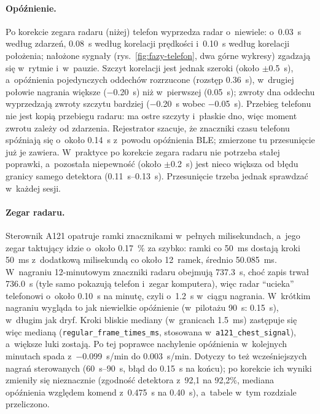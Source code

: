 \documentclass[12pt,a4paper,oneside]{report}
\begin{document}
\paragraph{Opóźnienie.} Po korekcie zegara radaru (niżej) telefon wyprzedza radar
o~niewiele: o~\SI{0.03}{s} według zdarzeń, \SI{0.08}{s} według korelacji
prędkości i~\SI{0.10}{s} według korelacji położenia; nałożone sygnały
(rys.~\ref{fig:fazy-telefon}, dwa górne wykresy) zgadzają się w~rytmie
i~w~pauzie. Szczyt korelacji jest jednak szeroki (około $\pm$\SI{0.5}{s}),
a~opóźnienia pojedynczych oddechów rozrzucone (rozstęp \SI{0.36}{s}), w~drugiej
połowie nagrania większe (\SI{-0.20}{s}) niż w~pierwszej (\SI{0.05}{s}); zwroty
dna oddechu wyprzedzają zwroty szczytu bardziej (\SI{-0.20}{s} wobec
\SI{-0.05}{s}). Przebieg telefonu nie jest kopią przebiegu radaru: ma ostre
szczyty i~płaskie dno, więc moment zwrotu zależy od zdarzenia. Rejestrator
szacuje, że znaczniki czasu telefonu spóźniają się o~około \SI{0.14}{s}
z~powodu opóźnienia BLE; zmierzone tu przesunięcie już je zawiera. W~praktyce
po korekcie zegara radaru nie potrzeba stałej poprawki, a~pozostała niepewność
(około $\pm$\SI{0.2}{s}) jest nieco większa od błędu granicy samego detektora
(\SIrange{0.11}{0.13}{s}). Przesunięcie trzeba jednak sprawdzać w~każdej sesji.

\paragraph{Zegar radaru.} Sterownik A121 opatruje ramki znacznikami w~pełnych
milisekundach, a~jego zegar taktujący idzie o~około \SI{0.17}{\percent} za szybko:
ramki co \SI{50}{ms} dostają kroki \SI{50}{ms} z~dodatkową milisekundą co około
12~ramek, średnio \SI{50.085}{ms}. W~nagraniu 12-minutowym znaczniki radaru
obejmują \SI{737.3}{s}, choć zapis trwał \SI{736.0}{s} (tyle samo pokazują
telefon i~zegar komputera), więc radar ``ucieka'' telefonowi o~około \SI{0.10}{s}
na minutę, czyli o~\SI{1.2}{s} w~ciągu nagrania. W~krótkim nagraniu wygląda to
jak niewielkie opóźnienie (w~pilotażu \SI{90}{s}: \SI{0.15}{s}), w~długim jak dryf.
Kroki bliskie mediany (w~granicach \SI{1.5}{ms}) zastępuje się więc
medianą (\texttt{regular\_frame\_times\_ms}, stosowana w~\texttt{a121\_chest\_signal}),
a~większe luki zostają. Po tej poprawce nachylenie opóźnienia w~kolejnych
minutach spada z~\SI{-0.099}{s/min} do \SI{0.003}{s/min}. Dotyczy to też wcześniejszych
nagrań sterowanych (\SIrange{60}{90}{s}, błąd do \SI{0.15}{s} na końcu); po korekcie
ich wyniki zmieniły się nieznacznie (zgodność detektora z~92,1 na 92,2\%, mediana
opóźnienia względem komend z~\SI{0.475}{s} na \SI{0.40}{s}), a~tabele w~tym rozdziale
przeliczono.
\end{document}
